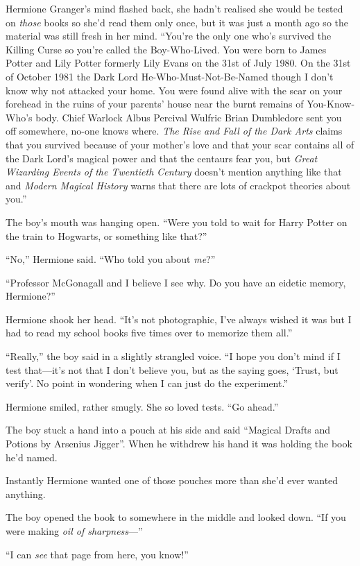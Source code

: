 Hermione Granger’s mind flashed back, she hadn’t realised she would be tested on \emph{those} books so she’d read them only once, but it was just a month ago so the material was still fresh in her mind. “You’re the only one who’s survived the Killing Curse so you’re called the Boy-Who-Lived. You were born to James Potter and Lily Potter formerly Lily Evans on the 31st of July 1980. On the 31st of October 1981 the Dark Lord He-Who-Must-Not-Be-Named though I don’t know why not attacked your home. You were found alive with the scar on your forehead in the ruins of your parents’ house near the burnt remains of You-Know-Who’s body. Chief Warlock Albus Percival Wulfric Brian Dumbledore sent you off somewhere, no-one knows where. \emph{The Rise and Fall of the Dark Arts} claims that you survived because of your mother’s love and that your scar contains all of the Dark Lord’s magical power and that the centaurs fear you, but \emph{Great Wizarding Events of the Twentieth Century} doesn’t mention anything like that and \emph{Modern Magical History} warns that there are lots of crackpot theories about you.”

The boy’s mouth was hanging open. “Were you told to wait for Harry Potter on the train to Hogwarts, or something like that?”

“No,” Hermione said. “Who told you about \emph{me}?”

“Professor McGonagall and I believe I see why. Do you have an eidetic memory, Hermione?”

Hermione shook her head. “It’s not photographic, I’ve always wished it was but I had to read my school books five times over to memorize them all.”

“Really,” the boy said in a slightly strangled voice. “I hope you don’t mind if I test that—it’s not that I don’t believe you, but as the saying goes, ‘Trust, but verify’. No point in wondering when I can just do the experiment.”

Hermione smiled, rather smugly. She so loved tests. “Go ahead.”

The boy stuck a hand into a pouch at his side and said “Magical Drafts and Potions by Arsenius Jigger”. When he withdrew his hand it was holding the book he’d named.

Instantly Hermione wanted one of those pouches more than she’d ever wanted anything.

The boy opened the book to somewhere in the middle and looked down. “If you were making \emph{oil of sharpness}—”

“I can \emph{see} that page from here, you know!”

